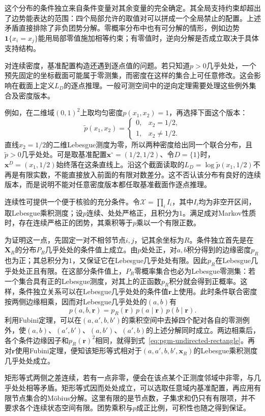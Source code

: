 这个分布的条件独立来自条件变量对其余变量的完全确定。其全局支持约束却超出了边势能表达的范围：四个局部允许的取值对可以拼成一个全局禁止的配置。上述矛盾直接排除了非负团势分解。零概率分布中也有可分解的情形，例如边势$\mathbf{1}\{x_i=x_j\}$能用局部零值施加相等约束；有零值时，逆向分解是否成立取决于具体支持结构。

对连续密度，基准配置构造还遇到逐点值的问题。若只知道$p>0$几乎处处，一个预先固定的坐标截面可能属于零测集，而密度在这样的集合上可任意修改。这会影响在截面上定义$L_D$的逐点推理。一般可测空间中的逆向定理需要处理这些例外集合及密度版本。

例如，在二维域$(0,1)^2$上取均匀密度$p(x_1,x_2)=1$，再选择下面这个版本：
\[
  \widetilde p(x_1,x_2)=
  \begin{cases}
    0,&x_2=1/2,\\
    1,&x_2\neq1/2.
  \end{cases}
\]
直线$x_2=1/2$的二维Lebesgue测度为零，所以两种密度给出同一个联合分布，且$\widetilde p>0$几乎处处。可是取基准配置$\bm{x}^{\circ}=(1/2,1/2)$、令$D=\{1\}$时，$\bm{x}^{D}=(x_1,1/2)$始终落在这条直线上。沿这个截面读取的$L_D=\log\widetilde p(x_1,1/2)$不再是有限实数，不能直接放入前面的有限对数差分。这不否认该分布有良好的连续版本，而是说明不能对任意密度版本都任取基准截面作逐点推理。

连续性可提供一个便于核验的充分条件。令$\mathcal{X}=\prod_i I_i$，其中$I_i$均为非空开区间，取Lebesgue乘积测度；设$p$连续、处处严格正，且积分为$1$。满足成对Markov性质时，存在连续严格正的团势，其乘积等于$p$乘以一个有限正数。

为证明这一点，先固定一对不相邻节点$i,j$，记其余坐标为$R$。条件独立首先是在$\bm{X}_R$的分布$P_R$几乎处处的条件值上成立。由$p$处处正，对$a,b$积分得到的边缘密度$p_R$也为正；其总积分为$1$，又保证它在Lebesgue几乎处处有限。因此$p_R$在Lebesgue几乎处处正且有限。在这部分条件值上，$P_R$零概率集合也必为Lebesgue零测集：若一个集合具有正的Lebesgue测度，对其上的正函数$p_R$积分就会得到正概率。这样，条件独立关系可以在Lebesgue几乎处处的条件值$\bm r$上使用。此时条件联合密度按两侧边缘相乘，因而对Lebesgue几乎处处的$(a,b)$有
\[
  p(a,b,\bm r)
  =p_R(\bm r)\,p(a\mid\bm r)\,p(b\mid\bm r).
\]
利用Fubini定理，可以在$(a,a',b,b')$的乘积空间中去掉四个配对各自的零测例外，使$(a,b)$、$(a',b')$、$(a,b')$、$(a',b)$的上述分解同时成立。两边相乘后，各个条件边缘因子和$p_R(\bm r)^2$相同，就得到式~\eqref{eq:pgm-undirected-rectangle}。再对$\bm r$使用Fubini定理，便知该矩形等式相对于$(a,a',b,b',\bm{x}_R)$的Lebesgue乘积测度几乎处处成立。

矩形等式两侧之差连续，若有一点非零，便会在该点某个正测度邻域中非零，与几乎处处相等矛盾。矩形等式因而处处成立，可以选取任意域内基准配置，再应用有限节点集合的Möbius分解。这里有限的是节点数，子集求和仍只有有限项，并不要求各个连续状态空间有限。团势乘积与$p$成正比例，可积性也随之得到保证。

